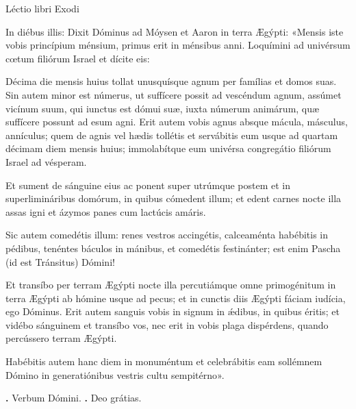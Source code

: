 
Léctio libri Exodi

In diébus illis:
Dixit Dóminus ad Móysen et Aaron in terra Ægýpti: «Mensis iste vobis princípium ménsium, primus erit in ménsibus anni. 
Loquímini ad univérsum cœtum filiórum Israel et dícite eis:

Décima die mensis huius tollat unusquísque agnum per famílias et domos suas. Sin autem minor est númerus, ut suffícere possit ad vescéndum agnum, assúmet vicínum suum, qui iunctus est dómui suæ, iuxta númerum animárum, quæ suffícere possunt ad esum agni. 
Erit autem vobis agnus absque mácula, másculus, annículus; quem de agnis vel hædis tollétis et servábitis eum usque ad quartam décimam diem mensis huius; immolabítque eum univérsa congregátio filiórum Israel ad vésperam. 

Et sument de sánguine eius ac ponent super utrúmque postem et in superlimináribus domórum, in quibus cómedent illum; et edent carnes nocte illa assas igni et ázymos panes cum lactúcis amáris. 

Sic autem comedétis illum: renes vestros accingétis, calceaménta habébitis in pédibus, tenéntes báculos in mánibus, et comedétis festinánter; est enim Pascha (id est Tránsitus) Dómini!

Et transíbo per terram Ægýpti nocte illa percutiámque omne primogénitum in terra Ægýpti ab hómine usque ad pecus; et in cunctis diis Ægýpti fáciam iudícia, ego Dóminus. Erit autem sanguis vobis in signum in ǽdibus, in quibus éritis; et vidébo sánguinem et transíbo vos, nec erit in vobis plaga dispérdens, quando percússero terram Ægýpti. 

Habébitis autem hanc diem in monuméntum et celebrábitis eam sollémnem Dómino in generatiónibus vestris cultu sempitérno».

\textbf{\Vbar.} Verbum Dómini.
\textbf{\Rbar.} Deo grátias.
\par